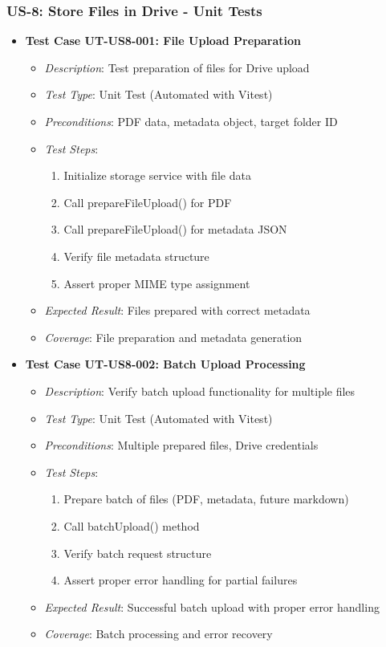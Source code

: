 \documentclass[12pt]{article}
\begin{document}
\subsubsection{US-8: Store Files in Drive - Unit Tests}
\begin{itemize}
  \item \textbf{Test Case UT-US8-001: File Upload Preparation}
    \begin{itemize}
      \item \textit{Description}: Test preparation of files for Drive upload
      \item \textit{Test Type}: Unit Test (Automated with Vitest)
      \item \textit{Preconditions}: PDF data, metadata object, target folder ID
      \item \textit{Test Steps}:
        \begin{enumerate}
          \item Initialize storage service with file data
          \item Call prepareFileUpload() for PDF
          \item Call prepareFileUpload() for metadata JSON
          \item Verify file metadata structure
          \item Assert proper MIME type assignment
        \end{enumerate}
      \item \textit{Expected Result}: Files prepared with correct metadata
      \item \textit{Coverage}: File preparation and metadata generation
    \end{itemize}

  \item \textbf{Test Case UT-US8-002: Batch Upload Processing}
    \begin{itemize}
      \item \textit{Description}: Verify batch upload functionality for multiple files
      \item \textit{Test Type}: Unit Test (Automated with Vitest)
      \item \textit{Preconditions}: Multiple prepared files, Drive credentials
      \item \textit{Test Steps}:
        \begin{enumerate}
          \item Prepare batch of files (PDF, metadata, future markdown)
          \item Call batchUpload() method
          \item Verify batch request structure
          \item Assert proper error handling for partial failures
        \end{enumerate}
      \item \textit{Expected Result}: Successful batch upload with proper error handling
      \item \textit{Coverage}: Batch processing and error recovery
    \end{itemize}
\end{itemize}
\end{document}
